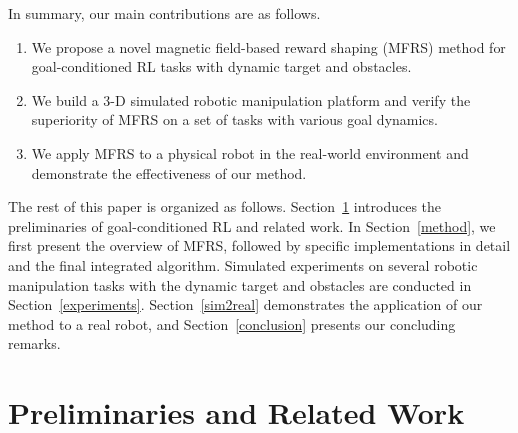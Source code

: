 \documentclass[journal]{IEEEtran}
\begin{document}
In summary, our main contributions are as follows.
\begin{enumerate}
\item We propose a novel magnetic field-based reward shaping (MFRS) method for goal-conditioned RL tasks with dynamic target and obstacles.
\item We build a 3-D simulated robotic manipulation platform and verify the superiority of MFRS on a set of tasks with various goal dynamics.
\item We apply MFRS to a physical robot in the real-world environment and demonstrate the effectiveness of our method.
\end{enumerate}
	
The rest of this paper is organized as follows. 
Section~\ref{prelimilaries} introduces the preliminaries of goal-conditioned RL and related work.
In Section~\ref{method}, we first present the overview of MFRS, followed by specific implementations in detail and the final integrated algorithm.
Simulated experiments on several robotic manipulation tasks with the dynamic target and obstacles are conducted in Section~\ref{experiments}.
Section~\ref{sim2real} demonstrates the application of our method to a real robot, and Section~\ref{conclusion} presents our concluding remarks.



\section{Preliminaries and Related Work}\label{prelimilaries}
\end{document}
